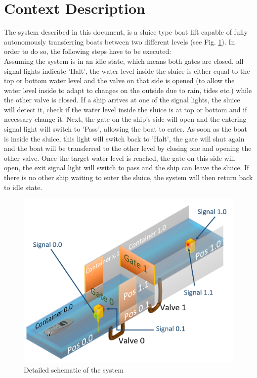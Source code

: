 \section{Context Description}
The system described in this document, is a sluice type boat lift capable of fully autonomously transferring boats between two different levels (see Fig. \ref{fig:boat1}). In order to do so, the following steps have to be executed:\\ 

Assuming the system is in an idle state, which means both gates are closed, all signal lights indicate 'Halt', the water level inside the sluice is either equal to the top or bottom water level and the valve on that side is opened (to allow the water level inside to adapt to changes on the outside due to rain, tides etc.) while the other valve is closed. If a ship arrives at one of the signal lights, the sluice will detect it, check if the water level inside the sluice is at top or bottom and if necessary change it. Next, the gate on the ship's side will open and the entering signal light will switch to 'Pass', allowing the boat to enter. As soon as the boat is inside the sluice, this light will switch back to 'Halt', the gate will shut again and the boat will be transferred to the other level by closing one and opening the other valve. Once the target water level is reached, the gate on this side will open, the exit signal light will switch to pass and the ship can leave the sluice. If there is no other ship waiting to enter the sluice, the system will then return back to idle state.

\begin{figure}[!h]
	\includegraphics[width=\linewidth]{PictureName10}
	\caption{Detailed schematic of the system}
	\label{fig:boat1}
\end{figure}